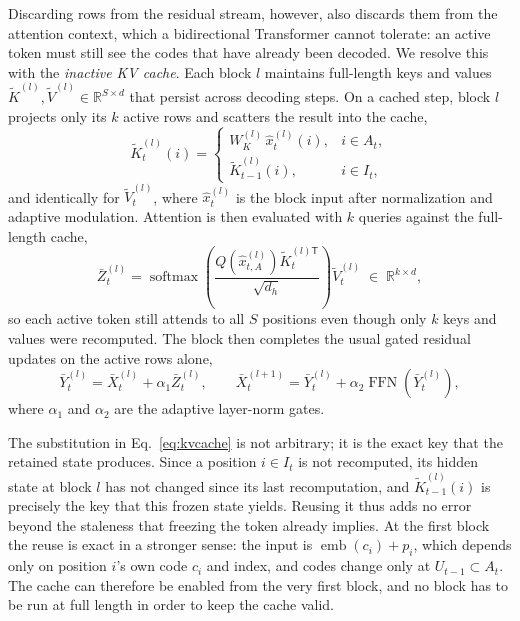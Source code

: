 Discarding rows from the residual stream, however, also discards them from the attention context, which a bidirectional Transformer cannot tolerate: an active token must still see the codes that have already been decoded. We resolve this with the \emph{inactive KV cache}. Each block $l$ maintains full-length keys and values $\widetilde{K}^{(l)},\widetilde{V}^{(l)}\in\mathbb{R}^{S\times d}$ that persist across decoding steps. On a cached step, block $l$ projects only its $k$ active rows and scatters the result into the cache,
\begin{equation}
    \widetilde{K}^{(l)}_t(i) =
    \begin{cases}
        W_K^{(l)}\,\hat{x}^{(l)}_t(i), & i\in A_t,\\[2pt]
        \widetilde{K}^{(l)}_{t-1}(i),  & i\in I_t,
    \end{cases}
    \label{eq:kvcache}
\end{equation}
and identically for $\widetilde{V}^{(l)}_t$, where $\hat{x}^{(l)}_t$ is the block input after normalization and adaptive modulation. Attention is then evaluated with $k$ queries against the full-length cache,
\begin{equation}
    \bar{Z}^{(l)}_t
    = \operatorname{softmax}\!\left(
        \frac{Q\!\left(\hat{x}^{(l)}_{t,A}\right)\widetilde{K}^{(l)\mathsf{T}}_t}{\sqrt{d_h}}
      \right)\widetilde{V}^{(l)}_t
    \;\in\; \mathbb{R}^{k\times d},
    \label{eq:lazyattn}
\end{equation}
so each active token still attends to all $S$ positions even though only $k$ keys and values were recomputed. The block then completes the usual gated residual updates on the active rows alone,
\begin{equation}
    \bar{Y}^{(l)}_t = \bar{X}^{(l)}_t + \alpha_1 \bar{Z}^{(l)}_t,
    \qquad
    \bar{X}^{(l+1)}_t = \bar{Y}^{(l)}_t + \alpha_2 \operatorname{FFN}\!\left(\bar{Y}^{(l)}_t\right),
    \label{eq:blockupdate}
\end{equation}
where $\alpha_1$ and $\alpha_2$ are the adaptive layer-norm gates.

The substitution in Eq.~\eqref{eq:kvcache} is not arbitrary; it is the exact key that the retained state produces. Since a position $i\in I_t$ is not recomputed, its hidden state at block $l$ has not changed since its last recomputation, and $\widetilde{K}^{(l)}_{t-1}(i)$ is precisely the key that this frozen state yields. Reusing it thus adds no error beyond the staleness that freezing the token already implies. At the first block the reuse is exact in a stronger sense: the input is $\operatorname{emb}(c_i)+p_i$, which depends only on position $i$'s own code $c_i$ and index, and codes change only at $U_{t-1}\subset A_t$. The cache can therefore be enabled from the very first block, and no block has to be run at full length in order to keep the cache valid.

